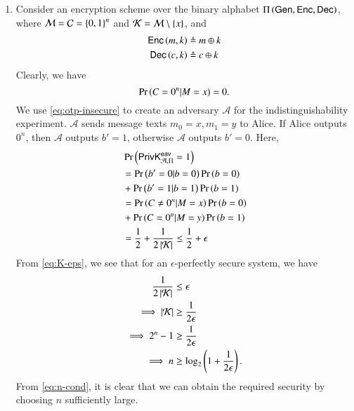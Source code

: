 \documentclass[journal,12pt,twocolumn]{IEEEtran}
\begin{document}
\begin{enumerate}
    \item Consider an encryption scheme over the binary alphabet
    \(\Pi\left(\textsf{Gen},\textsf{Enc},\textsf{Dec}\right)\), where \(\mathcal{M} =
    \mathcal{C} = \left\{0,1\right\}^n\) and \(\mathcal{K} =
    \mathcal{M}\setminus\left\{x\right\}\), and
        \begin{align}
            \textsf{Enc}\left(m,k\right) &\triangleq m\oplus{}k \label{eq:otp-enc-def} \\
            \textsf{Dec}\left(c,k\right) &\triangleq c\oplus{}k \label{eq:otp-dec-def}
        \end{align}
        Clearly, we have
        \begin{equation}
            \Pr\left(C=0^n|M=x\right) = 0.
            \label{eq:otp-insecure}
        \end{equation}
        We use \eqref{eq:otp-insecure} to create an adversary \(\mathcal{A}\)
        for the indistinguishability experiment. \(\mathcal{A}\) sends message
        texts \(m_0 = x, m_1 = y\) to Alice. If Alice outputs \(0^n\), then
        \(\mathcal{A}\) outputs \(b' = 1\), otherwise \(\mathcal{A}\) outputs
        \(b' = 0\). Here,
        \begin{align}
            &\Pr\left(\textsf{PrivK}_{\mathcal{A},\Pi}^{\textsf{eav}} = 1\right) \nonumber \\ 
            &= \Pr\left(b' = 0|b = 0\right)\Pr\left(b=0\right) \nonumber \\ 
            &+ \Pr\left(b' = 1|b = 1\right)\Pr\left(b=1\right) \\
            &= \Pr\left(C \neq 0^n|M = x\right)\Pr\left(b=0\right) \nonumber \\ 
            &+ \Pr\left(C = 0^n|M = y\right)\Pr\left(b=1\right) \\
            &= \frac{1}{2} + \frac{1}{2\left\vert\mathcal{K}\right\vert} \le \frac{1}{2} + \epsilon
            \label{eq:K-eps}
        \end{align}
        From \eqref{eq:K-eps}, we see that for an \(\epsilon\)-perfectly secure
        system, we have
        \begin{align}
            \frac{1}{2\left\vert\mathcal{K}\right\vert} &\le \epsilon \\
            \implies \left\vert\mathcal{K}\right\vert &\ge \frac{1}{2\epsilon} \\
            \implies 2^n - 1 &\ge \frac{1}{2\epsilon} \\
            \implies n &\ge \log_2\left(1 + \frac{1}{2\epsilon}\right).
            \label{eq:n-cond}
        \end{align}
        From \eqref{eq:n-cond}, it is clear that we can obtain the required
        security by choosing \(n\) sufficiently large.


\end{enumerate}
\end{document}
